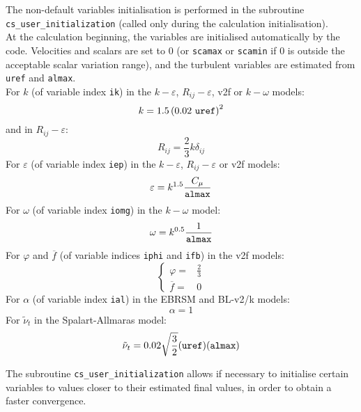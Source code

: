 {{{The non-default variables initialisation is performed in the subroutine \texttt{cs\_user\_initialization} (called only during the calculation initialisation).\\ At the calculation beginning, the variables are initialised
automatically by the code. Velocities and scalars are set to 0 (or \texttt{scamax} or \texttt{scamin} if 0 is outside the acceptable
scalar variation range), and the turbulent variables are estimated from
\texttt{uref} and \texttt{almax}. \\
For $k$ (of variable index \texttt{ik}) in the $k-\varepsilon$,
$R_{ij}-\varepsilon$, v2f or $k-\omega$ models:
\begin{equation*}
k = 1.5 \left(0.02 \textrm{ \texttt{uref}}\right)^2
\end{equation*}
and in $R_{ij}-\varepsilon$:
\begin{equation*}
R_{ij}=\frac{2}{3}k\delta_{ij}
\end{equation*}
For $\varepsilon$ (of variable index \texttt{iep}) in the $k-\varepsilon$,
$R_{ij}-\varepsilon$ or v2f models:
\begin{equation*}
\varepsilon = k^{1.5} \frac{C_\mu}{\textrm{\texttt{almax}}}
\end{equation*}
For $\omega$ (of variable index \texttt{iomg}) in the $k-\omega$ model:
\begin{equation*}
\omega = k^{0.5} \frac{1}{\textrm{\texttt{almax}}}
\end{equation*}
For $\varphi$ and $\overline{f}$ (of variable indices \texttt{iphi} and
\texttt{ifb}) in the v2f models:
\begin{equation*}
\left\{\begin{array}{ll}
\varphi = & \frac{2}{3} \\
\overline{f} = & 0
\end{array}\right.
\end{equation*}
For $\alpha$ (of variable index \texttt{ial}) in the EBRSM and BL-v2/k models:
\begin{equation*}
\alpha = 1
\end{equation*}
For $\tilde{\nu}_t$ in the Spalart-Allmaras model:
\begin{equation*}
\tilde{\nu}_t = 0.02 \sqrt{\frac{3}{2}} (\textrm{\texttt{uref}}) (\textrm{\texttt{almax}})
\end{equation*}

The subroutine \texttt{cs\_user\_initialization} allows if necessary to
initialise certain variables to values closer to their estimated final values,
in order to obtain a faster convergence.

}}}
